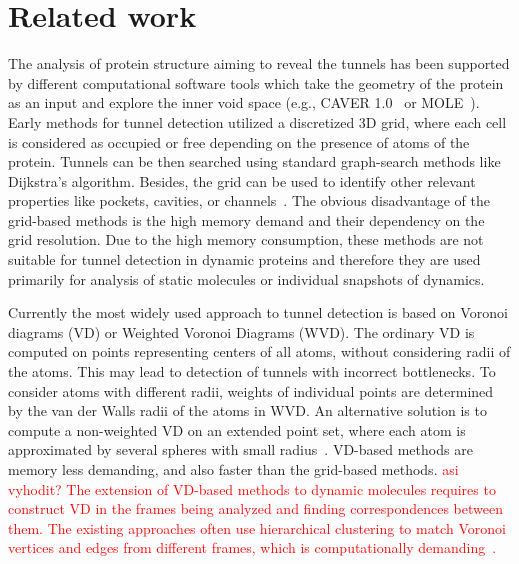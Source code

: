 \documentclass{svmult}
\newcommand{\red}[1]{\textcolor{red}{#1}}
\begin{document}
\section{Related work}


The analysis of protein structure aiming to reveal the tunnels has been supported by different computational software tools which take the geometry of the protein as an input and explore the inner void space (e.g., CAVER 1.0~\cite{petrek2006caver} or MOLE~\cite{Petrek20071357}). 
Early methods for tunnel detection utilized a discretized 3D grid, where each cell is considered as occupied or free depending
on the presence of atoms of the protein.
Tunnels can be then searched using standard graph-search methods like Dijkstra's algorithm.
Besides, the grid can be used to identify other relevant properties like 
pockets, cavities, or channels~\cite{sehnal2013mole,petrek2006caver}.
The obvious disadvantage of the grid-based methods is the high memory demand and their dependency on the grid resolution.
Due to the high memory consumption, these methods are not suitable for tunnel detection in dynamic proteins and therefore they
are used primarily for analysis of static molecules or individual snapshots of dynamics.

Currently the most widely used approach to tunnel detection is based on Voronoi diagrams (VD) or Weighted Voronoi Diagrams (WVD).
The ordinary VD is computed on points representing centers of all atoms, without considering radii of the atoms.
This may lead to detection of tunnels with incorrect bottlenecks. %
To consider atoms with different radii, weights of individual points are determined by the van der Walls radii of the atoms in WVD.
An alternative solution is to compute a non-weighted VD on an extended point set, where 
each atom is approximated by several spheres with small radius~\cite{yaffe2008,caver3}.
VD-based methods are memory less demanding, and also faster than the grid-based methods.
\red{asi vyhodit?
The extension of VD-based methods to dynamic molecules requires to construct VD in the frames being analyzed and 
finding correspondences between them.
The existing approaches often use hierarchical clustering to match Voronoi vertices and edges from different frames, which is computationally demanding~\cite{lindow2012dynamic,caverDetails}.
}
\end{document}
